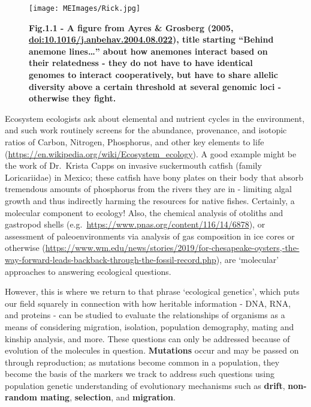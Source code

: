 \documentclass[
]{article}
\begin{document}
\begin{figure}
\centering
\texttt{[image: MEImages/Rick.jpg]}
\caption{\textbf{Fig.1.1 - A figure from Ayres \& Grosberg (2005,
\url{doi:10.1016/j.anbehav.2004.08.022}), title starting ``Behind
anemone lines\ldots{}'' about how anemones interact based on their
relatedness - they do not have to have identical genomes to interact
cooperatively, but have to share allelic diversity above a certain
threshold at several genomic loci - otherwise they fight.}}
\end{figure}

Ecosystem ecologists ask about elemental and nutrient cycles in the
environment, and such work routinely screens for the abundance,
provenance, and isotopic ratios of Carbon, Nitrogen, Phosphorus, and
other key elements to life
(\url{https://en.wikipedia.org/wiki/Ecosystem_ecology}). A good example
might be the work of Dr.~Krista Capps on invasive suckermouth catfish
(family Loricariidae) in Mexico; these catfish have bony plates on their
body that absorb tremendous amounts of phosphorus from the rivers they
are in - limiting algal growth and thus indirectly harming the resources
for native fishes. Certainly, a molecular component to ecology! Also,
the chemical analysis of otoliths and gastropod shells
(e.g.~\url{https://www.pnas.org/content/116/14/6878}), or assessment of
paleoenvironments via analysis of gas composition in ice cores or
otherwise
(\url{https://www.wm.edu/news/stories/2019/for-chesapeake-oysters,-the-way-forward-leads-backback-through-the-fossil-record.php}),
are `molecular' approaches to answering ecological questions.

However, this is where we return to that phrase `ecological genetics',
which puts our field squarely in connection with how heritable
information - DNA, RNA, and proteins - can be studied to evaluate the
relationships of organisms as a means of considering migration,
isolation, population demography, mating and kinship analysis, and more.
These questions can only be addressed because of evolution of the
molecules in question. \textbf{Mutations} occur and may be passed on
through reproduction; as mutations become common in a population, they
become the basis of the markers we track to address such questions using
population genetic understanding of evolutionary mechanisms such as
\textbf{drift}, \textbf{non-random mating}, \textbf{selection}, and
\textbf{migration}.
\end{document}

